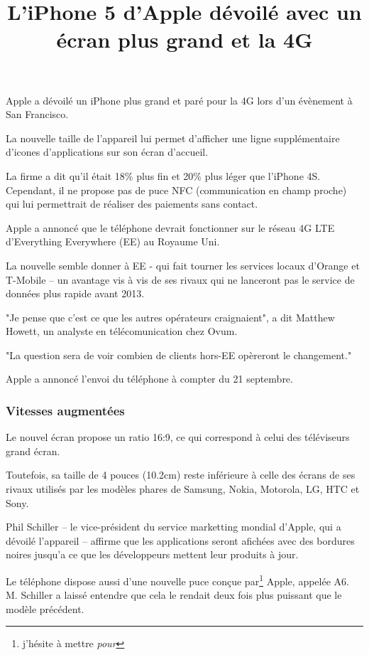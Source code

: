 \documentclass[a4paper, 11pt]{article}
\title{L'iPhone 5 d'Apple dévoilé avec un écran plus grand et la 4G}
\author{}
\date{}
\begin{document}
\maketitle

Apple a dévoilé un iPhone plus grand et paré pour la 4G lors d'un évènement à San Francisco.

La nouvelle taille de l'appareil lui permet d'afficher une ligne supplémentaire d'icones d'applications sur son écran
d'accueil.

La firme a dit qu'il était 18\% plus fin et 20\% plus léger que l'iPhone 4S.
Cependant, il ne propose pas de puce NFC (communication en champ proche) qui lui permettrait de réaliser des paiements
sans contact.

Apple a annoncé que le téléphone devrait fonctionner sur le réseau 4G LTE d'Everything Everywhere (EE) au Royaume Uni.

La nouvelle semble donner à EE - qui fait tourner les services locaux d'Orange et T-Mobile -- un avantage vis à vis de
ses rivaux qui ne lanceront pas le service de données plus rapide avant 2013.

"Je pense que c'est ce que les autres opérateurs craignaient", a dit Matthew Howett, un analyste en
télécomunication chez Ovum.

"La question sera de voir combien de clients hors-EE opèreront le changement."

Apple a annoncé l'envoi du téléphone à compter du 21 septembre.

\subsubsection*{Vitesses augmentées}

Le nouvel écran propose un ratio 16:9, ce qui correspond à celui des téléviseurs grand écran.

Toutefois, sa taille de 4 pouces (10.2cm) reste inférieure à celle des écrans de ses rivaux utilisés par les modèles phares
de Samsung, Nokia, Motorola, LG, HTC et Sony.

Phil Schiller -- le vice-président du service marketting mondial d'Apple, qui a dévoilé l'appareil -- affirme que les
applications seront afichées avec des bordures noires jusqu'a ce que les développeurs mettent leur produits à jour.

Le téléphone dispose aussi d'une nouvelle puce conçue par\footnote{j'hésite à mettre {\it pour}} Apple, appelée A6.
M. Schiller a laissé entendre que cela le rendait deux fois plus puissant que le modèle précédent.
\end{document}
